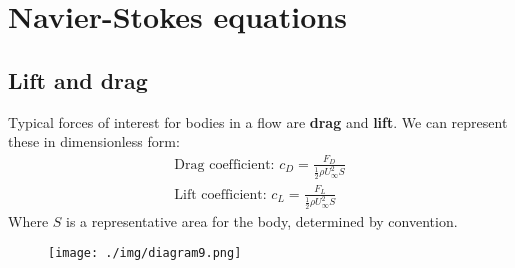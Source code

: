 \chapter{Navier-Stokes equations}
\section{Lift and drag}
Typical forces of interest for bodies in a flow are \textbf{drag} and \textbf{lift}. We can represent these in dimensionless form:
\begin{gather}
  \textrm{Drag coefficient: }c_D = \frac{F_D}{\frac{1}{2} \rho U_\infty^2S}\\
  \textrm{Lift coefficient: }c_L = \frac{F_L}{\frac{1}{2}\rho U_\infty^2S}
\end{gather}
Where $S$ is a representative area for the body, determined by convention.
\begin{figure}[H]
  \centering
  \texttt{[image: ./img/diagram9.png]}
\end{figure}
